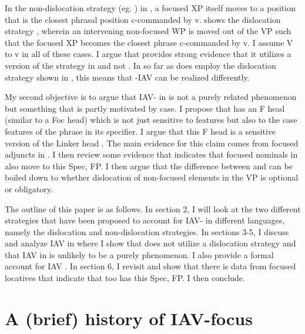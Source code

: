 \documentclass[output=paper,newtxmath,modfonts,nonflat,draft]{langsci/langscibook}
\begin{document}
In the non-dislocation strategy (eg. \citealt{vanderwal2006}) in , a focused XP itself moves to a position that is the closest phrasal position c-commanded by v.  shows the dislocation strategy \citep{ChengDowning2009}, wherein an intervening non-focused WP is moved out of the VP such that the focused XP becomes the closest phrase c-commanded by v. I assume V to v  in all of these cases. I argue that  provides strong evidence that it utilizes a version of the strategy in  and not . In so far as  does employ the dislocation strategy shown in , this means that -IAV  can be realized differently. 

My second objective is to argue that IAV- in  is not a purely  related phenomenon but something that is partly motivated by case. I propose that  has an F head (similar to a Foc head) which is not just sensitive to  features but also to the case features of the phrase in its specifier. I argue that this F head is a  sensitive version of the Linker head \citep{Baker2006}. The main evidence for this claim comes from focused adjuncts in . I then review some evidence that indicates that focused nominals in  also move to this Spec, FP. I then argue that the difference between  and  can be boiled down to whether dislocation of non-focused elements in the VP is optional or obligatory.

The outline of this paper is as follows. In section 2, I will look at the two different strategies that have been proposed to account for IAV- in different  languages, namely the dislocation and non-dislocation strategies. In sections 3-5, I discuss and analyze IAV  in  where I show that  does not utilize a dislocation strategy and that IAV  in  is unlikely to be a purely  phenomenon. I also provide a formal account for  IAV . In section 6, I revisit  and show that there is data from focused locatives that indicate that  too has this Spec, FP. I then conclude.

\section{ A (brief) history of IAV-focus}
\end{document}
